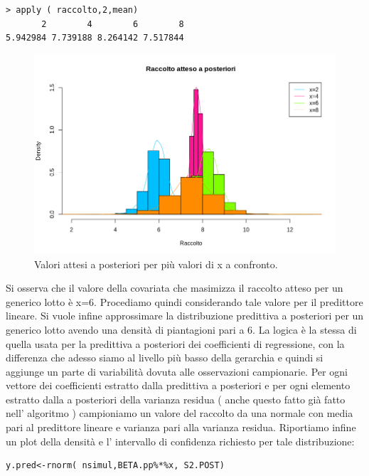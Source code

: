 {
\color{red}
\begin{Verbatim}
> apply ( raccolto,2,mean)
       2        4        6        8
5.942984 7.739188 8.264142 7.517844
\end{Verbatim}
}

\begin{figure}
    \centering
    \includegraphics[totalheight=8cm]{img/esercizio11-2-5.png}
    \caption{  Valori attesi a posteriori per più valori di x a confronto.}
\end{figure}

Si osserva che il valore della covariata che masimizza il raccolto atteso per un 
generico lotto è x=6. Procediamo quindi considerando tale valore per il predittore 
lineare. Si vuole infine approssimare la distribuzione predittiva a posteriori per 
un generico lotto avendo una densità di piantagioni pari a 6. La logica è la stessa 
di quella usata per la predittiva a posteriori dei coefficienti di regressione, con 
la differenza che adesso siamo al livello più basso della gerarchia e quindi si 
aggiunge un parte di variabilità dovuta alle osservazioni campionarie. 
Per ogni vettore dei coefficienti estratto dalla predittiva a posteriori e per ogni 
elemento estratto dalla a posteriori della varianza residua ( anche questo fatto già 
fatto nell' algoritmo ) campioniamo un valore del raccolto da una normale con 
media pari al predittore lineare e varianza pari alla varianza residua. 
Riportiamo infine un plot della densità e l' intervallo di confidenza richiesto per 
tale distribuzione:

\begin{lstlisting}[style=R]
y.pred<-rnorm( nsimul,BETA.pp%*%x, S2.POST)
\end{lstlisting}

